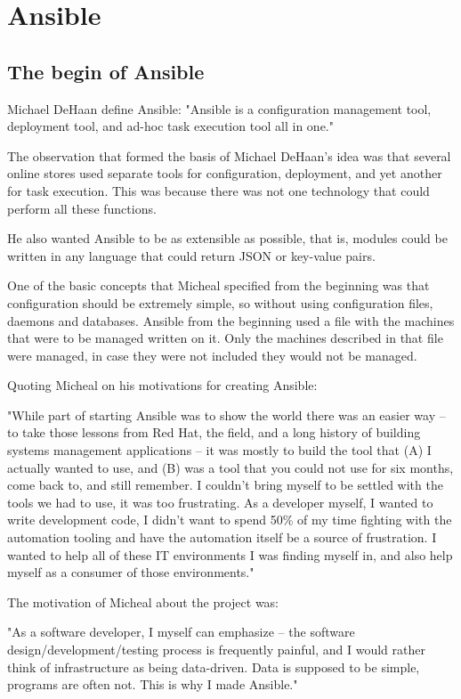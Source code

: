 \documentclass[12pt,a4paper,openright,twoside]{book}
\begin{document}
\chapter{Ansible}

\section{The begin of Ansible}

Michael DeHaan define Ansible:
"Ansible is a configuration management tool, deployment tool, and ad-hoc task execution tool all in one."


The observation that formed the basis of Michael DeHaan's idea was that several online stores used separate tools for configuration, deployment, and yet another for task execution. This was because there was not one technology that could perform all these functions.


He also wanted Ansible to be as extensible as possible, that is, modules could be written in any language that could return JSON or key-value pairs.

One of the basic concepts that Micheal specified from the beginning was that configuration should be extremely simple, so without using configuration files, daemons and databases. Ansible from the beginning used a file with the machines that were to be managed written on it. Only the machines described in that file were managed, in case they were not included they would not be managed.

Quoting Micheal on his motivations for creating Ansible:


"While part of starting Ansible was to show the world there was an easier way -- to take those lessons from Red Hat, the field, and a long history of building systems management applications -- it was mostly to build the tool that (A) I actually wanted to use, and (B) was a tool that you could not use for six months, come back to, and still remember. I couldn't bring myself to be settled with the tools we had to use, it was too frustrating. As a developer myself, I wanted to write development code, I didn't want to spend 50\% of my time fighting with the automation tooling and have the automation itself be a source of frustration. I wanted to help all of these IT environments I was finding myself in, and also help myself as a consumer of those environments."

The motivation of Micheal about the project was:


"As a software developer, I myself can emphasize -- the software design/development/testing process is frequently painful, and I would rather think of infrastructure as being data-driven. Data is supposed to be simple, programs are often not. This is why I made Ansible."
\end{document}
